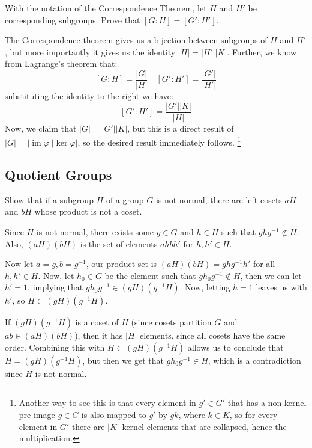 \documentclass[10pt]{article}
\DeclareMathOperator{\im}{im}
\begin{document}
\begin{problem}
	With the notation of the Correspondence Theorem, let \( H \) and \( H' \) be 
	corresponding subgroups. Prove that \( [G : H] = [G':H'] \). 
\end{problem}

\begin{solution}
	The Correspondence theorem gives us a bijection between subgroups of \( H \) and 
	\( H' \), but more importantly it gives us the identity \( |H| = |H'| |K| \). 
	Further, we know from Lagrange's theorem that:
	\[
		[G : H] = \frac{|G|}{|H|} \quad [G' : H'] = \frac{|G'|}{|H'|}
	\] 
	substituting the identity to the right we have:
	\[
		[G' : H'] = \frac{|G'| |K|}{|H|}
	\] 
	Now, we claim that \( |G| = |G'| |K| \), but this is a direct result 
	of \( |G| = |\im \varphi| |\ker \varphi| \), so the desired result 
	immediately follows.
	\footnote{Another way to see this is that every element in \(g' \in  G' \) that has 
		a non-kernel pre-image \( g \in G \) is also mapped to \( g' \) by 
		\( gk \), where \( k \in K \), so for every element in \( G' \) there are 
	\( |K| \) kernel elements that are collapsed, hence the multiplication.}
\end{solution}

\addtocounter{subsection}{1}
\subsection{Quotient Groups}
\begin{problem}
	Show that if a subgroup \( H \) of a group \( G \) is not normal, there are 
	left cosets \( aH \) and \( bH \) whose product is not a coset. 
\end{problem}

\begin{solution}
	Since \( H \) is not normal, there exists some  \( g \in G \) and \( h \in H \) 
	such that \( ghg^{-1} \not \in H \). Also, \( (aH)(bH) \) is the set 
	of elements \( ahbh'\) for \( h, h' \in H \). 

	Now let \( a = g, b = g^{-1} \), our product set is \( (aH)(bH) = 
	ghg^{-1} h'\) for all \( h, h' \in H \). Now, let \( h_0 \in G \) be the element 
	such that \( gh_0g^{-1} \not \in H \), then we can let \( h' = 1 \), 
	implying that \( gh_0g^{-1} \in (gH)(g^{-1} H) \). Now, letting \( h = 1 \)
	leaves us with \( h'\), so \( H \subset (gH)(g^{-1}H) \).

	If \( (gH)(g^{-1} H) \) is a coset of \( H \) (since cosets partition \( G \) 
	and \( ab \in (aH)(bH) \)), then it has \( |H| \) elements, 
	since all cosets have the same order. Combining this with 
	\( H \subset (gH)(g^{-1} H) \) allows us to conclude that 
	\( H = (gH)(g^{-1} H) \), but then we get that 
	\( gh_0g^{-1} \in H \), which is a contradiction since \( H \) is not normal.  
\end{solution}
\end{document}

